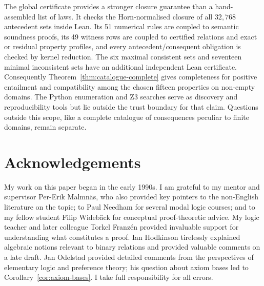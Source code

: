 \documentclass[11pt,a4paper,reqno]{amsart}
\theoremstyle{definition}
\theoremstyle{remark}
\begin{document}
The global certificate provides a stronger closure guarantee than a
hand-assembled list of laws.  It checks the Horn-normalised closure of all
$32{,}768$ antecedent sets inside Lean.  Its 51 numerical rules are coupled to
semantic soundness proofs, its 49 witness rows are coupled to certified
relations and exact or residual property profiles, and every
antecedent/consequent obligation is checked by kernel reduction.  The six
maximal consistent sets and seventeen minimal inconsistent sets have an
additional independent Lean certificate.  Consequently
Theorem~\ref{thm:catalogue-complete} gives completeness for positive entailment
and compatibility among the chosen fifteen properties on non-empty domains.
The Python enumeration and Z3 searches serve as discovery and reproducibility
tools but lie outside the trust boundary for that claim.  Questions outside
this scope, like a complete catalogue of consequences peculiar to finite
domains, remain separate.

\section*{Acknowledgements}
My work on this paper began in the early 1990s.  I am grateful to my mentor and
supervisor Per-Erik Malmnäs, who also provided key pointers to the non-English
literature on the topic; to Paul Needham for several modal logic courses; and to
my fellow student Filip Widebäck for conceptual proof-theoretic advice.  My
logic teacher and later colleague Torkel Franzén provided invaluable support for
understanding what constitutes a proof.  Ian Hodkinson tirelessly explained
algebraic notions relevant to binary relations and provided valuable comments
on a late draft.  Jan Odelstad provided detailed comments from the perspectives of elementary
logic and preference theory; his question about axiom bases led to
Corollary~\ref{cor:axiom-bases}.  I take full responsibility for all errors.
\end{document}
